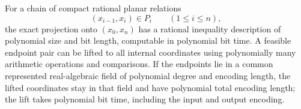 \begin{theorem}
\label{s4:path-projection}
For a chain of compact rational planar relations
\begin{equation}
 (x_{i-1},x_i)\in P_i\qquad(1\le i\le n),
 \label{s4:path-chain}
\end{equation}
the exact projection onto $(x_0,x_n)$ has a rational inequality
description of polynomial size and bit length, computable in
polynomial bit time. A feasible endpoint pair can be lifted to all
internal coordinates using polynomially many arithmetic operations and
comparisons. If the endpoints lie in a common represented real-algebraic
field of polynomial degree and
encoding length, the lifted coordinates stay in that field and have
polynomial total encoding length; the lift takes polynomial bit time,
including the input and output encoding.
\end{theorem}
